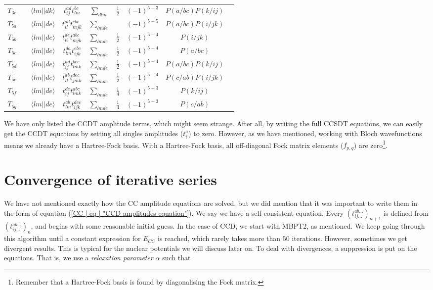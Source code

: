 \begin{table}[h]
\begin{tabular}{ccccccccc}
			$T_{3e}$ & & $\langle lm||dk \rangle$ & $t_{ij}^{ad}t_{lm}^{bc}$ & $\sum_{dlm}$ & $\frac{1}{2}$ & $(-1)^{5-3}$ & $P(a/bc)P(k/ij)$ &\\
			$T_{5a}$ & & $\langle lm||de \rangle$ & $t_{il}^{ad}t_{mjk}^{ebc}$ & $\sum_{lmde}$ & & $(-1)^{5-5}$ & $P(a/bc)P(i/jk)$ &\\
			$T_{5b}$ & & $\langle lm||de \rangle$ & $t_{li}^{de}t_{mjk}^{abc}$ & $\sum_{lmde}$ & $\frac{1}{2}$ & $(-1)^{5-4}$ & $P(i/jk)$ &\\
			$T_{5c}$ & & $\langle lm||de \rangle$ & $t_{lm}^{da}t_{ijk}^{ebc}$ & $\sum_{lmde}$ & $\frac{1}{2}$ & $(-1)^{5-4}$ & $P(a/bc)$ &\\
			$T_{5d}$ & & $\langle lm||de \rangle$ & $t_{ij}^{ad}t_{lmk}^{bec}$ & $\sum_{lmde}$ & $\frac{1}{2}$ & $(-1)^{5-4}$ & $P(a/bc)P(k/ij)$ &\\
			$T_{5e}$ & & $\langle lm||de \rangle$ & $t_{il}^{ab}t_{jmk}^{dec}$ & $\sum_{lmde}$ & $\frac{1}{2}$ & $(-1)^{5-4}$ & $P(c/ab)P(i/jk)$ &\\
			$T_{5f}$ & & $\langle lm||de \rangle$ & $t_{ij}^{de}t_{lmk}^{abc}$ & $\sum_{lmde}$ & $\frac{1}{4}$ & $(-1)^{5-3}$ & $P(k/ij)$ &\\
			$T_{5g}$ & & $\langle lm||de \rangle$ & $t_{lm}^{ab}t_{ijk}^{dec}$ & $\sum_{lmde}$ & $\frac{1}{4}$ & $(-1)^{5-3}$ & $P(c/ab)$ &\\ \hline
		\end{tabular}
		\label{CC | table | "CCDT T3 amp eq derivation"}
	\end{table} 
	
	We have only listed the CCDT amplitude terms, which might seem strange. After all, by writing the full CCSDT equations, we can easily get the CCDT equations by setting all singles amplitudes ($t_i^a$) to zero. However, as we have mentioned, working with Bloch wavefunctions means we already have a Hartree-Fock basis. With a Hartree-Fock basis, all off-diagonal Fock matrix elements ($f_{p,q}$) are zero\footnote{Remember that a Hartree-Fock basis is found by diagonalising the Fock matrix.}.
	
	\section{Convergence of iterative series}
	We have not mentioned exactly how the CC amplitude equations are solved, but we did mention that it was important to write them in the form of equation (\ref{CC | eq | "CCD amplitudes equation"}). We say we have a self-consistent equation. Every $(t_{ij\ldots}^{ab\ldots})_{n+1}$ is defined from $(t_{ij\ldots}^{ab\ldots})_{n}$, and begins with some reasonable initial guess. In the case of CCD, we start with MBPT2, as mentioned. We keep going through this algorithm until a constant expression for $E_{CC}$ is reached, which rarely takes more than $50$ iterations. However, sometimes we get divergent results. This is typical for the nuclear potentials we will discuss later on. To deal with divergences, a suppression is put on the equations. That is, we use a \emph{relaxation parameter} $\alpha$ such that
	

